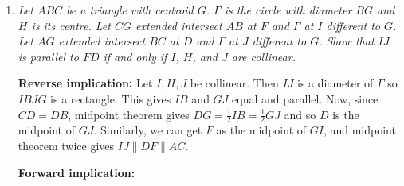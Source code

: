 \documentclass{article}
\begin{document}
\begin{enumerate}[1.]
\vspace{24pt}
\item %
{\itshape Let $ABC$ be a triangle with centroid $G$.
$\Gamma$ is the circle with diameter $BG$ and $H$ is its centre.
Let $CG$ extended intersect $AB$ at $F$ and $\Gamma$ at $I$ different to $G$.
Let $AG$ extended intersect $BC$ at $D$ and $\Gamma$ at $J$ different to $G$. Show that $IJ$ is parallel to $FD$ if and only if $I$, $H$, and $J$ are collinear.}

\textbf{Reverse implication:}
Let $I,H,J$ be collinear. Then $IJ$ is a diameter of $\Gamma$ so $IBJG$ is a rectangle. This gives $IB$ and $GJ$ equal and parallel. Now, since $CD=DB$, midpoint theorem gives $DG=\frac{1}{2}IB = \frac{1}{2}GJ$ and so $D$ is the midpoint of $GJ$. Similarly, we can get $F$ as the midpoint of $GI$, and midpoint theorem twice gives $IJ \parallel DF \parallel AC$.

\textbf{Forward implication:}


\end{enumerate}
\end{document}
